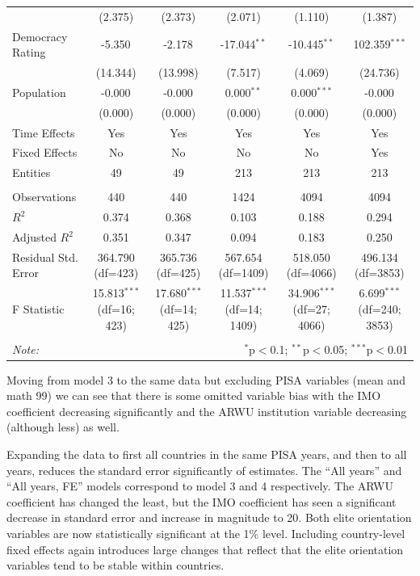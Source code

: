\documentclass[11pt]{article}
\begin{document}
\begin{table}[H]
{\begin{tabular}{@{\extracolsep{5pt}}lccccc}
    & (2.375) & (2.373) & (2.071) & (1.110) & (1.387) \\
    Democracy Rating & -5.350$^{}$ & -2.178$^{}$ & -17.044$^{**}$ & -10.445$^{**}$ & 102.359$^{***}$ \\
    & (14.344) & (13.998) & (7.517) & (4.069) & (24.736) \\
    Population & -0.000$^{}$ & -0.000$^{}$ & 0.000$^{**}$ & 0.000$^{***}$ & -0.000$^{}$ \\
    & (0.000) & (0.000) & (0.000) & (0.000) & (0.000) \\
    Time Effects & Yes & Yes & Yes & Yes & Yes \\
    Fixed Effects & No & No & No & No & Yes \\
    Entities & 49 & 49 & 213 & 213 & 213 \\
    \hline \\[-1.8ex]
    Observations & 440 & 440 & 1424 & 4094 & 4094 \\
    $R^2$ & 0.374 & 0.368 & 0.103 & 0.188 & 0.294 \\
    Adjusted $R^2$ & 0.351 & 0.347 & 0.094 & 0.183 & 0.250 \\
    Residual Std. Error & 364.790 (df=423) & 365.736 (df=425) & 567.654 (df=1409) & 518.050 (df=4066) & 496.134 (df=3853) \\
    F Statistic & 15.813$^{***}$ (df=16; 423) & 17.680$^{***}$ (df=14; 425) & 11.537$^{***}$ (df=14; 1409) & 34.906$^{***}$ (df=27; 4066) & 6.699$^{***}$ (df=240; 3853) \\
    \hline
    \hline \\[-1.8ex]
    \textit{Note:} & \multicolumn{5}{r}{$^{*}$p$<$0.1; $^{**}$p$<$0.05; $^{***}$p$<$0.01} \\
    \end{tabular}
    }
    \end{table}
Moving from model 3 to the same data but excluding PISA variables (mean and math 99) we can see that there is some omitted variable bias with the IMO coefficient decreasing significantly and the ARWU institution variable decreasing (although less) as well.

Expanding the data to first all countries in the same PISA years, and then to all years, reduces the standard error significantly of estimates. The “All years” and “All years, FE” models correspond to model 3 and 4 respectively. The ARWU coefficient has changed the least, but the IMO coefficient has seen a significant decrease in standard error and increase in magnitude to 20. Both elite orientation variables are now statistically significant at the 1\% level. Including country-level fixed effects again introduces large changes that reflect that the elite orientation variables tend to be stable within countries.
\end{document}
